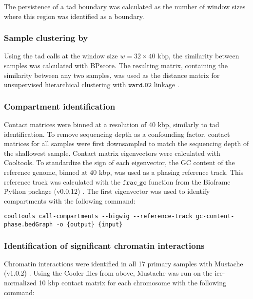 The persistence of a \gls{tad} boundary was calculated as the number of window sizes where this region was identified as a boundary.

\subsubsection{Sample clustering by }

Using the \gls{tad} calls at the window size $w = 32 \times 40$ kbp, the similarity between samples was calculated with BPscore.
The resulting matrix, containing the similarity between any two samples, was used as the distance matrix for unsupervised hierarchical clustering with $\texttt{ward.D2}$ linkage \cite{murtaghWardHierarchicalAgglomerative2014}.

\subsubsection{Compartment identification}

Contact matrices were binned at a resolution of 40 kbp, similarly to \gls{tad} identification.
To remove sequencing depth as a confounding factor, contact matrices for all samples were first downsampled to match the sequencing depth of the shallowest sample.
Contact matrix eigenvectors were calculated with Cooltools.
To standardize the sign of each eigenvector, the GC content of the reference genome, binned at 40 kbp, was used as a phasing reference track.
This reference track was calculated with the $\texttt{frac\_gc}$ function from the Bioframe Python package (v0.0.12) \cite{nezarabdennurMirnylabBioframeV02020}.
The first eigenvector was used to identify compartments with the following command:

\begin{lstlisting}[basicstyle=\ttfamily]
cooltools call-compartments --bigwig --reference-track gc-content-phase.bedGraph -o {output} {input}
\end{lstlisting}

\subsubsection{Identification of significant chromatin interactions}

Chromatin interactions were identified in all 17 primary samples with Mustache (v1.0.2) \cite{roayaeiardakanyMustacheMultiscaleDetection2020}.
Using the Cooler files from above, Mustache was run on the \gls{ice}-normalized 10 kbp contact matrix for each chromosome with the following command:

